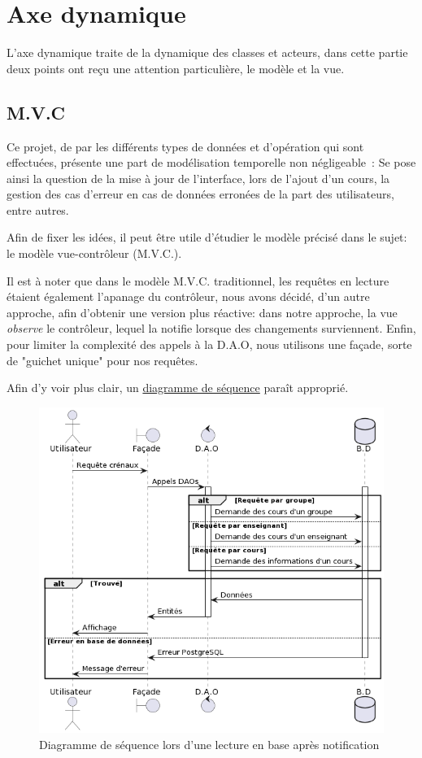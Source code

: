\documentclass[a4paper,french,final]{memoir}
\begin{document}
\chapter{Axe dynamique}\label{chap:dynamique}
L'axe dynamique traite de la dynamique des classes et acteurs, dans cette partie deux points ont reçu une attention particulière, le modèle
et la vue.
\section{M.V.C}
Ce projet, de par les différents types de données et d'opération qui sont effectuées, présente une part de modélisation temporelle non négligeable : Se pose ainsi la question de la mise à jour de l'interface, lors de l'ajout d'un cours, la gestion des cas d'erreur en cas de données erronées de la part des utilisateurs, entre autres. 



Afin de fixer les idées, il peut être utile  d'étudier le modèle précisé dans le sujet: le modèle vue-contrôleur (M.V.C.).

Il est à noter que dans le modèle M.V.C. traditionnel, les requêtes en lecture étaient également l'apanage du contrôleur, nous avons décidé, d'un autre approche, afin d'obtenir une version plus réactive: dans notre approche, la vue \emph{observe} le contrôleur, lequel la notifie lorsque des changements surviennent. Enfin, pour limiter la complexité des appels à la D.A.O, nous utilisons une façade, sorte de "guichet unique" pour nos requêtes. 

Afin d'y voir plus clair, un \hyperref[fig:diagsec]{diagramme de séquence} paraît approprié. 
\begin{figure}[ht]
    \centering
    \includegraphics[width=\textwidth]{figures/diag_seq.png}
    \caption[Diagramme de séquence]{Diagramme de séquence lors d'une lecture en base après notification}
    \label{fig:diagseq}
\end{figure}
\end{document}
